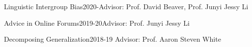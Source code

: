       {Linguistic Intergroup Bias}{2020-}{Advisor: Prof. David Beaver, Prof. Junyi Jessy Li}{}

      {Advice in Online Forums}{2019-20}{Advisor: Prof. Junyi Jessy Li}{}

        {Decomposing Generalization}{2018-19}
        {Advisor: Prof. Aaron Steven White}{}

